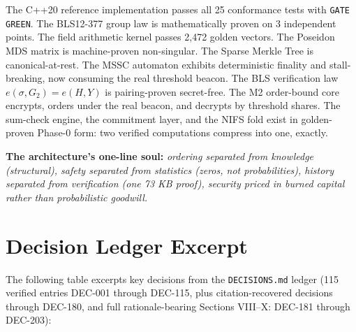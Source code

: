 \documentclass[11pt, a4paper]{article}
\begin{document}
The C++20 reference implementation passes all 25 conformance tests with \texttt{GATE GREEN}. The BLS12-377 group law is mathematically proven on 3 independent points. The field arithmetic kernel passes 2,472 golden vectors. The Poseidon MDS matrix is machine-proven non-singular. The Sparse Merkle Tree is canonical-at-rest. The MSSC automaton exhibits deterministic finality and stall-breaking, now consuming the real threshold beacon. The BLS verification law $e(\sigma, G_2) = e(H, Y)$ is pairing-proven secret-free. The M2 order-bound core encrypts, orders under the real beacon, and decrypts by threshold shares. The sum-check engine, the commitment layer, and the NIFS fold exist in golden-proven Phase-0 form: two verified computations compress into one, exactly.

\textbf{The architecture's one-line soul:} \textit{ordering separated from knowledge (structural), safety separated from statistics (zeros, not probabilities), history separated from verification (one 73 KB proof), security priced in burned capital rather than probabilistic goodwill.}

\appendix
\section{Decision Ledger Excerpt}

The following table excerpts key decisions from the \texttt{DECISIONS.md} ledger (115 verified entries DEC-001 through DEC-115, plus citation-recovered decisions through DEC-180, and full rationale-bearing Sections VIII--X: DEC-181 through DEC-203):
\end{document}
